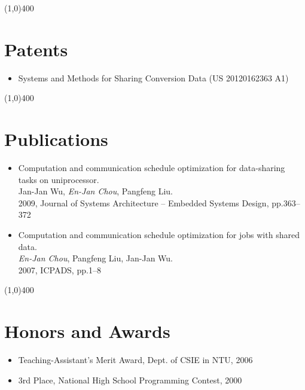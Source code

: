 \documentclass[10pt,a4paper]{article}
\newcommand{\hr}{\noindent\line(1,0){400}}
\newcommand{\br}{\hfill\\}
\begin{document}
\hr
\section*{Patents}
\begin{itemize}
\item Systems and Methods for Sharing Conversion Data (US 20120162363 A1)
\end{itemize}

\hr
\section*{Publications}
\begin{itemize}
\item Computation and communication schedule optimization for data-sharing tasks on uniprocessor.\br
Jan-Jan Wu, \emph{En-Jan Chou}, Pangfeng Liu.\br
2009, Journal of Systems Architecture -- Embedded Systems Design, pp.363--372
\item Computation and communication schedule optimization for jobs with shared data.\br
\emph{En-Jan Chou}, Pangfeng Liu, Jan-Jan Wu.\br
2007, ICPADS, pp.1--8
\end{itemize}

\hr
\section*{Honors and Awards}
\begin{itemize}
\item Teaching-Assistant’s Merit Award, Dept. of CSIE in NTU, 2006
\item 3rd Place, National High School Programming Contest, 2000
\end{itemize}
\end{document}
